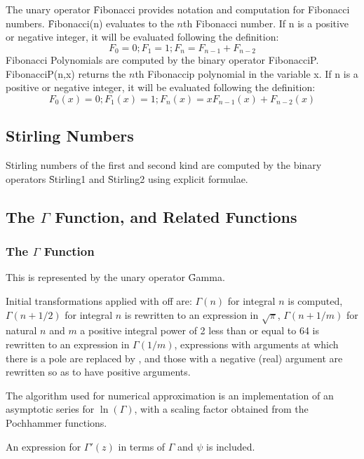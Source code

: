 The unary operator \f{Fibonacci} provides notation and computation for
Fibonacci numbers.  \f{Fibonacci(n)} evaluates to the $n$th Fibonacci
number. If n is a positive or negative integer, it will be evaluated following
the definition:
\[
F_0 = 0 ; F_1 = 1 ; F_n = F_{n-1} + F_{n-2}
\]
Fibonacci Polynomials are computed by the binary operator 
FibonacciP. FibonacciP(n,x) returns the $n$th Fibonaccip polynomial
in the variable x. If n is a positive or negative integer, it will be evaluated following
the definition:
\[
F_0(x) = 0 ; F_1(x) = 1 ; F_n(x) = x F_{n-1}(x) + F_{n-2}(x) 
\]

\subsection{Stirling Numbers}
Stirling numbers of the first and second kind are computed 
by the binary operators \f{Stirling1} and \f{Stirling2}
using explicit formulae.


\subsection{The \texorpdfstring{$\Gamma$}{Gamma} Function, and Related Functions}

\subsubsection{The  \texorpdfstring{$\Gamma$}{Gamma} Function}

This is represented by the unary operator \f{Gamma}.

Initial transformations applied with  off are: $\Gamma(n)$ for
integral $n$ is computed, $\Gamma(n+1/2)$ for integral $n$ is rewritten to
an expression in $\sqrt\pi$, $\Gamma(n+1/m)$ for natural $n$ and $m$ a
positive integral power of 2 less than or equal to 64 is rewritten to an
expression in $\Gamma(1/m)$, expressions with arguments at which there is a
pole are replaced by , and those with a negative (real)
argument are rewritten so as to have positive arguments.

The algorithm used for numerical approximation is an implementation of an
asymptotic series for $\ln(\Gamma)$, with a scaling factor obtained from
the Pochhammer functions.

An expression for $\Gamma'(z)$ in terms of $\Gamma$ and $\psi$ is
included.



